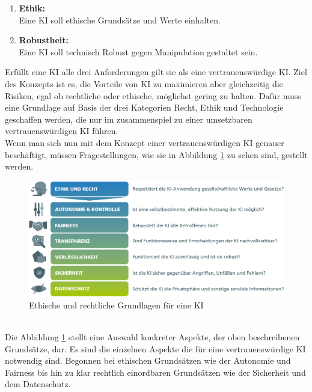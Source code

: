 \begin{onehalfspace}
\begin{enumerate}
            \item \textbf{Ethik:} \\ Eine \ac*{KI} soll ethische Grundsätze und Werte einhalten.
            \item \textbf{Robustheit:} \\ Eine \ac*{KI} soll technisch Robust gegen Manipulation gestaltet sein.
        \end{enumerate}
        Erfüllt eine \ac*{KI} alle drei Anforderungen gilt sie als eine vertrauenswürdige \ac*{KI}. Ziel des Konzepts ist es, die Vorteile von \ac*{KI} zu maximieren aber gleichzeitig die Risiken, egal ob rechtliche oder ethische, möglichst gering zu halten.\cite{HEGKI2019} Dafür muss eine Grundlage auf Basis der drei Kategorien Recht, Ethik und Technologie geschaffen werden, die nur im zusammenspiel zu einer umsetzbaren vertrauenswürdigen \ac*{KI} führen.
        \\
        Wenn man sich nun mit dem Konzept einer vertrauenswürdigen \ac*{KI} genauer beschäftigt, müssen Fragestellungen, wie sie in Abbildung \ref*{fig:EthikAnforderungen} zu sehen sind, gestellt werden. 
        \\
        \begin{figure}[h]
            \centering
            \includegraphics[width = 14cm]{Bilder/Grafik-KI_Whitepaper_final_WEB_2.png}
            \caption{Ethische und rechtliche Grundlagen für eine \ac*{KI} \cite{Cremers2019}}
            \label{fig:EthikAnforderungen}
        \end{figure}
        \\
        Die Abbildung \ref*{fig:EthikAnforderungen} stellt eine Auswahl konkreter Aspekte, der oben beschreibenen Grundsätze, dar. Es sind die einzelnen Aspekte die für eine vertrauenswürdige \ac*{KI} notwendig sind. Begonnen bei ethischen Grundsätzen wie der Autonomie und Fairness bis hin zu klar rechtlich einordbaren Grundsätzen wie der Sicherheit und dem Datenschutz.\cite{Cremers2019}

\end{onehalfspace}

